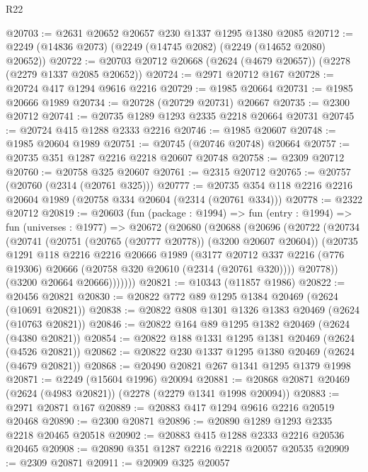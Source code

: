 \begin{lexlean}{R22}
\begin{coremodule}
@20703 := @2631 @20652 @20657 @230 @1337 @1295 @1380 @2085
@20712 := @2249 (@14836 @2073) (@2249 (@14745 @2082) (@2249 (@14652 @2080) @20652))
@20722 := @20703 @20712 @20668 (@2624 (@4679 @20657)) (@2278 (@2279 @1337 @2085 @20652))
@20724 := @2971 @20712 @167
@20728 := @20724 @417 @1294 @9616 @2216
@20729 := @1985 @20664
@20731 := @1985 @20666 @1989
@20734 := @20728 (@20729 @20731) @20667
@20735 := @2300 @20712
@20741 := @20735 @1289 @1293 @2335 @2218 @20664 @20731
@20745 := @20724 @415 @1288 @2333 @2216
@20746 := @1985 @20607
@20748 := @1985 @20604 @1989
@20751 := @20745 (@20746 @20748) @20664
@20757 := @20735 @351 @1287 @2216 @2218 @20607 @20748
@20758 := @2309 @20712
@20760 := @20758 @325 @20607
@20761 := @2315 @20712
@20765 := @20757 (@20760 (@2314 (@20761 @325)))
@20777 := @20735 @354 @118 @2216 @2216 @20604 @1989 (@20758 @334 @20604 (@2314 (@20761 @334)))
@20778 := @2322 @20712
@20819 := @20603
    (fun (package : @1994) =>
    fun (entry : @1994) =>
    fun (universes : @1977) =>
    @20672
      (@20680
        (@20688
          (@20696
            (@20722
              (@20734
                (@20741
                  (@20751 (@20765 (@20777 @20778)) (@3200 @20607 @20604))
                  (@20735
                    @1291
                    @118
                    @2216
                    @2216
                    @20666
                    @1989
                    (@3177
                      @20712
                      @337
                      @2216
                      (@776 @19306)
                      @20666
                      (@20758 @320 @20610 (@2314 (@20761 @320))))
                    @20778))
                (@3200 @20664 @20666)))))))
@20821 := @10343 (@11857 @1986)
@20822 := @20456 @20821
@20830 := @20822 @772 @89 @1295 @1384 @20469 (@2624 (@10691 @20821))
@20838 := @20822 @808 @1301 @1326 @1383 @20469 (@2624 (@10763 @20821))
@20846 := @20822 @164 @89 @1295 @1382 @20469 (@2624 (@4380 @20821))
@20854 := @20822 @188 @1331 @1295 @1381 @20469 (@2624 (@4526 @20821))
@20862 := @20822 @230 @1337 @1295 @1380 @20469 (@2624 (@4679 @20821))
@20868 := @20490 @20821 @267 @1341 @1295 @1379 @1998
@20871 := @2249 (@15604 @1996) @20094
@20881 := @20868 @20871 @20469 (@2624 (@4983 @20821)) (@2278 (@2279 @1341 @1998 @20094))
@20883 := @2971 @20871 @167
@20889 := @20883 @417 @1294 @9616 @2216 @20519 @20468
@20890 := @2300 @20871
@20896 := @20890 @1289 @1293 @2335 @2218 @20465 @20518
@20902 := @20883 @415 @1288 @2333 @2216 @20536 @20465
@20908 := @20890 @351 @1287 @2216 @2218 @20057 @20535
@20909 := @2309 @20871
@20911 := @20909 @325 @20057

\end{coremodule}
\end{lexlean}
